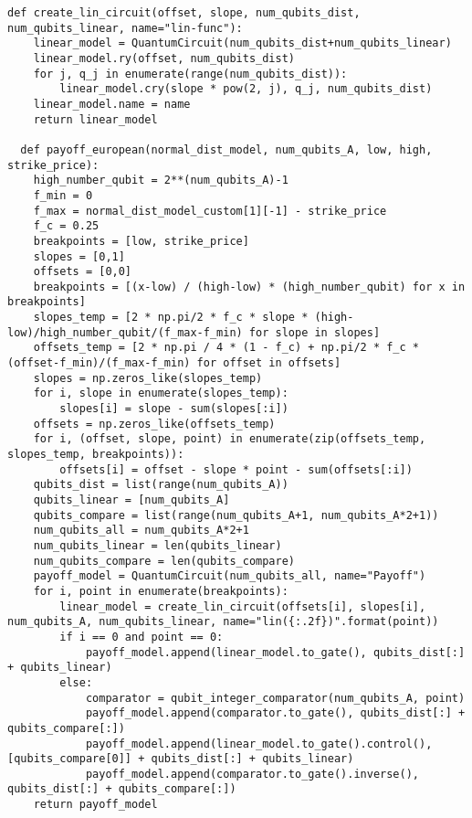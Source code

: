 \documentclass[../../main.tex]{subfiles}
\begin{document}
\begin{lstlisting}[caption={Implementation of payoff piecewise-linear function as described in section \ref{sec:ImplPieceFunc}},captionpos=b]
  def create_lin_circuit(offset, slope, num_qubits_dist, num_qubits_linear, name="lin-func"):
    linear_model = QuantumCircuit(num_qubits_dist+num_qubits_linear)
    linear_model.ry(offset, num_qubits_dist)
    for j, q_j in enumerate(range(num_qubits_dist)):
        linear_model.cry(slope * pow(2, j), q_j, num_qubits_dist)
    linear_model.name = name
    return linear_model

  def payoff_european(normal_dist_model, num_qubits_A, low, high, strike_price):
    high_number_qubit = 2**(num_qubits_A)-1
    f_min = 0
    f_max = normal_dist_model_custom[1][-1] - strike_price
    f_c = 0.25
    breakpoints = [low, strike_price]
    slopes = [0,1]
    offsets = [0,0]
    breakpoints = [(x-low) / (high-low) * (high_number_qubit) for x in breakpoints]
    slopes_temp = [2 * np.pi/2 * f_c * slope * (high-low)/high_number_qubit/(f_max-f_min) for slope in slopes]
    offsets_temp = [2 * np.pi / 4 * (1 - f_c) + np.pi/2 * f_c * (offset-f_min)/(f_max-f_min) for offset in offsets]
    slopes = np.zeros_like(slopes_temp)
    for i, slope in enumerate(slopes_temp):
        slopes[i] = slope - sum(slopes[:i])
    offsets = np.zeros_like(offsets_temp)
    for i, (offset, slope, point) in enumerate(zip(offsets_temp, slopes_temp, breakpoints)):
        offsets[i] = offset - slope * point - sum(offsets[:i])
    qubits_dist = list(range(num_qubits_A))
    qubits_linear = [num_qubits_A]
    qubits_compare = list(range(num_qubits_A+1, num_qubits_A*2+1))
    num_qubits_all = num_qubits_A*2+1
    num_qubits_linear = len(qubits_linear)
    num_qubits_compare = len(qubits_compare)
    payoff_model = QuantumCircuit(num_qubits_all, name="Payoff")
    for i, point in enumerate(breakpoints):
        linear_model = create_lin_circuit(offsets[i], slopes[i], num_qubits_A, num_qubits_linear, name="lin({:.2f})".format(point))
        if i == 0 and point == 0:
            payoff_model.append(linear_model.to_gate(), qubits_dist[:] + qubits_linear)
        else:
            comparator = qubit_integer_comparator(num_qubits_A, point)
            payoff_model.append(comparator.to_gate(), qubits_dist[:] + qubits_compare[:])
            payoff_model.append(linear_model.to_gate().control(), [qubits_compare[0]] + qubits_dist[:] + qubits_linear)
            payoff_model.append(comparator.to_gate().inverse(), qubits_dist[:] + qubits_compare[:])
    return payoff_model
\end{lstlisting}
\end{document}
